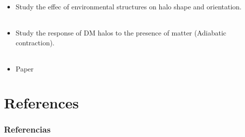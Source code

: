 \documentclass[xcolor=dvipsnames]{beamer}
\begin{document}
\begin{frame}

\begin{itemize}

\item Study the effec of environmental structures on halo shape and orientation.\\~\\

\item Study the response of DM halos to the presence of matter (Adiabatic contraction).\\~\\

\item Paper

\end{itemize}

\end{frame}











\section{References}
\begin{frame}[t, allowframebreaks]
\frametitle{Referencias}
\tiny


\end{frame}
\end{document}
